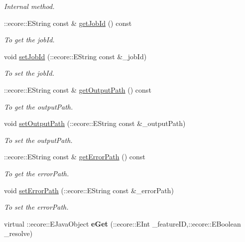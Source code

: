 \begin{DoxyCompactItemize}
\begin{DoxyCompactList}\small\item\em Internal method. \item\end{DoxyCompactList}\item 
::ecore::EString const \& \hyperlink{classTMS__Data_1_1JobResult_a229e5c2da10f981c06d8e03ce01f2058}{getJobId} () const 
\begin{DoxyCompactList}\small\item\em To get the jobId. \item\end{DoxyCompactList}\item 
void \hyperlink{classTMS__Data_1_1JobResult_a1adc73aeb7fbf6f3895edcaba7920a1c}{setJobId} (::ecore::EString const \&\_\-jobId)
\begin{DoxyCompactList}\small\item\em To set the jobId. \item\end{DoxyCompactList}\item 
::ecore::EString const \& \hyperlink{classTMS__Data_1_1JobResult_aa4356d21777892761a35278173c7b75a}{getOutputPath} () const 
\begin{DoxyCompactList}\small\item\em To get the outputPath. \item\end{DoxyCompactList}\item 
void \hyperlink{classTMS__Data_1_1JobResult_aea2289a627c88f59ba721b2df672fbd2}{setOutputPath} (::ecore::EString const \&\_\-outputPath)
\begin{DoxyCompactList}\small\item\em To set the outputPath. \item\end{DoxyCompactList}\item 
::ecore::EString const \& \hyperlink{classTMS__Data_1_1JobResult_a80e12cc725efa422821cc21da04565f0}{getErrorPath} () const 
\begin{DoxyCompactList}\small\item\em To get the errorPath. \item\end{DoxyCompactList}\item 
void \hyperlink{classTMS__Data_1_1JobResult_a56ff1703b3f9e58ab91b348b14fcb956}{setErrorPath} (::ecore::EString const \&\_\-errorPath)
\begin{DoxyCompactList}\small\item\em To set the errorPath. \item\end{DoxyCompactList}\item 
\hypertarget{classTMS__Data_1_1JobResult_acf7521f54b67e0d58abf10127b264982}{
virtual ::ecore::EJavaObject {\bfseries eGet} (::ecore::EInt \_\-featureID,::ecore::EBoolean \_\-resolve)}
\label{classTMS__Data_1_1JobResult_acf7521f54b67e0d58abf10127b264982}


\end{DoxyCompactItemize}
